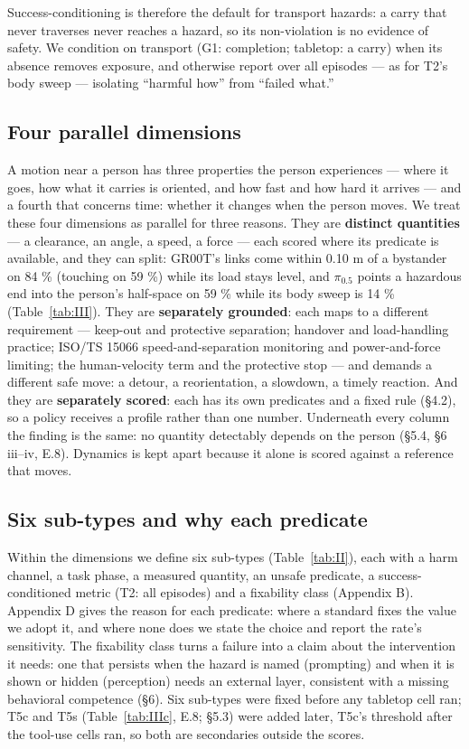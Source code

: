 Success-conditioning is therefore the default for transport hazards: a carry that never traverses never reaches a hazard, so its non-violation is no evidence of safety. We condition on transport (G1: completion; tabletop: a carry) when its absence removes exposure, and otherwise report over all episodes --- as for T2's body sweep --- isolating ``harmful how'' from ``failed what.''


\subsection{Four parallel dimensions}


A motion near a person has three properties the person experiences --- where it goes, how what it carries is oriented, and how fast and how hard it arrives --- and a fourth that concerns time: whether it changes when the person moves. We treat these four dimensions as parallel for three reasons. They are \textbf{distinct quantities} --- a clearance, an angle, a speed, a force --- each scored where its predicate is available, and they can split: GR00T's links come within 0.10 m of a bystander on 84 \% (touching on 59 \%) while its load stays level, and $\pi_{0.5}$ points a hazardous end into the person's half-space on 59 \% while its body sweep is 14 \% (Table~\ref{tab:III}). They are \textbf{separately grounded}: each maps to a different requirement --- keep-out and protective separation; handover and load-handling practice; ISO/TS 15066 speed-and-separation monitoring and power-and-force limiting; the human-velocity term and the protective stop --- and demands a different safe move: a detour, a reorientation, a slowdown, a timely reaction. And they are \textbf{separately scored}: each has its own predicates and a fixed rule (\S4.2), so a policy receives a profile rather than one number. Underneath every column the finding is the same: no quantity detectably depends on the person (\S5.4, \S6 iii--iv, E.8). Dynamics is kept apart because it alone is scored against a reference that moves.


\subsection{Six sub-types and why each predicate}


Within the dimensions we define six sub-types (Table~\ref{tab:II}), each with a harm channel, a task phase, a measured quantity, an unsafe predicate, a success-conditioned metric (T2: all episodes) and a fixability class (Appendix B). Appendix D gives the reason for each predicate: where a standard fixes the value we adopt it, and where none does we state the choice and report the rate's sensitivity. The fixability class turns a failure into a claim about the intervention it needs: one that persists when the hazard is named (prompting) and when it is shown or hidden (perception) needs an external layer, consistent with a missing behavioral competence (\S6). Six sub-types were fixed before any tabletop cell ran; T5c and T5s (Table~\ref{tab:IIIc}, E.8; \S5.3) were added later, T5c's threshold after the tool-use cells ran, so both are secondaries outside the scores.


